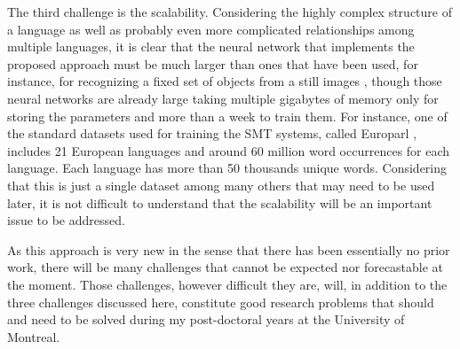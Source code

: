 \documentclass[11pt, oneside]{essay}
\begin{document}
The third challenge is the scalability. Considering the highly
complex structure of a language as well as probably even more
complicated relationships among multiple languages, it is clear
that the neural network that implements the proposed approach
must be much larger than ones that have been used, for instance,
for recognizing a fixed set of objects from a still images
\citep[see, e.g.,][]{Krizhevsky2012,Le2012}, though those
neural networks are already large taking multiple gigabytes
of memory only for storing the parameters and more than a
week to train them. For instance, one of the standard datasets
used for training the SMT systems, called Europarl
\citep{Koehn2005}, includes 21 European languages and around 60
million word occurrences for each language. Each language has
more than 50 thousands unique words. Considering that this is
just a single dataset among many others that may need to be used
later, it is not difficult to understand that the scalability
will be an important issue to be addressed.

As this approach is very new in the sense that there has been
essentially no prior work, there will be many challenges that
cannot be expected nor forecastable at the moment. Those
challenges, however difficult they are, will, in addition to the
three challenges discussed here, constitute good research
problems that should and need to be solved during my
post-doctoral years at the University of Montreal.






















\end{document}

